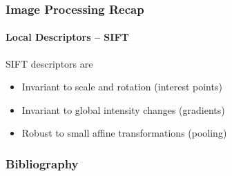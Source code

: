 \documentclass[xetex,professionalfont]{beamer}
\begin{document}
\begin{frame}
\frametitle{Image Processing Recap}
\framesubtitle{Local Descriptors -- SIFT}

SIFT descriptors are
\begin{itemize}
    \item Invariant to scale and rotation (interest points)
    \item Invariant to global intensity changes (gradients)
    \item Robust to small affine transformations (pooling)
\end{itemize}

\end{frame}


\begin{frame}[allowframebreaks=0.9]
\frametitle{Bibliography}

\printbibliography

\end{frame}
\end{document}
